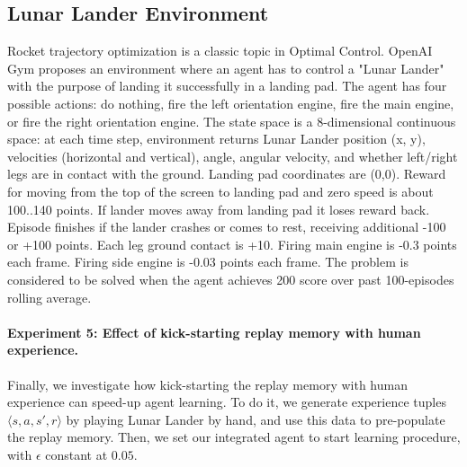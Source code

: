 \subsection{Lunar Lander Environment}
    \label{subsec:lunarlander}
    Rocket trajectory optimization is a classic topic in Optimal Control.
    OpenAI Gym proposes an environment where an agent has to control a "Lunar Lander" with the purpose of landing it successfully in a landing pad.
    The agent has four possible actions: do nothing, fire the left orientation engine, fire the main engine, or fire the right orientation engine.
    The state space is a 8-dimensional continuous space: at each time step, environment returns Lunar Lander position (x, y), velocities (horizontal and vertical), angle, angular velocity, and whether left/right legs are in contact with the ground.
    Landing pad coordinates are (0,0).
    Reward for moving from the top of the screen to landing pad and zero speed is about 100..140 points.
    If lander moves away from landing pad it loses reward back.
    Episode finishes if the lander crashes or comes to rest, receiving additional -100 or +100 points.
    Each leg ground contact is +10.
    Firing main engine is -0.3 points each frame.
    Firing side engine is -0.03 points each frame.
    The problem is considered to be solved when the agent achieves 200 score over past 100-episodes rolling average.


    \paragraph{Experiment 5: Effect of kick-starting replay memory with human experience.}
    Finally, we investigate how kick-starting the replay memory with human experience can speed-up agent learning.
    To do it, we generate experience tuples $\langle s, a, s', r \rangle$ by playing Lunar Lander by hand, and use this data to pre-populate the replay memory.
    Then, we set our integrated agent to start learning procedure, with $\epsilon$ constant at $0.05$.